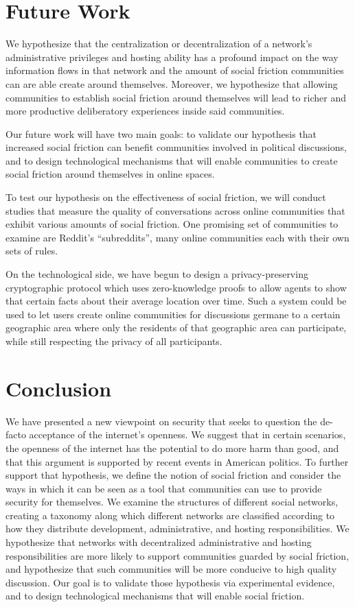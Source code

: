 \documentclass[sigconf,authordraft]{acmart}
\begin{document}
\section{Future Work}

We hypothesize that the centralization or decentralization of a network's administrative privileges and hosting ability has a profound impact on the way information flows in that network and the amount of social friction communities can are able create around themselves. Moreover, we hypothesize that allowing communities to establish social friction around themselves will lead to richer and more productive deliberatory experiences inside said communities.

Our future work will have two main goals: to validate our hypothesis that increased social friction can benefit communities involved in political discussions, and to design technological mechanisms that will enable communities to create social friction around themselves in online spaces. 

To test our hypothesis on the effectiveness of social friction, we will conduct studies that measure the quality of conversations across online communities that exhibit various amounts of social friction. One promising set of communities to examine are Reddit's ``subreddits'', many online communities each with their own sets of rules.

On the technological side, we have begun to design a privacy-preserving cryptographic protocol which uses zero-knowledge proofs \cite{goldreich1991proofs} to allow agents to show that certain facts about their average location over time. Such a system could be used to let users create online communities for discussions germane to a certain geographic area where only the residents of that geographic area can participate, while still respecting the privacy of all participants.

\section{Conclusion}

We have presented a new viewpoint on security that seeks to question the de-facto acceptance of the internet's openness. We suggest that in certain scenarios, the openness of the internet has the potential to do more harm than good, and that this argument is supported by recent events in American politics. To further support that hypothesis, we define the notion of social friction and consider the ways in which it can be seen as a tool that communities can use to provide security for themselves. We examine the structures of different social networks, creating a taxonomy along which different networks are classified according to how they distribute development, administrative, and hosting responsibilities. We hypothesize that networks with decentralized administrative and hosting responsibilities are more likely to support communities guarded by social friction, and hypothesize that such communities will be more conducive to high quality discussion. Our goal is to validate those hypothesis via experimental evidence, and to design technological mechanisms that will enable social friction.




\end{document}
